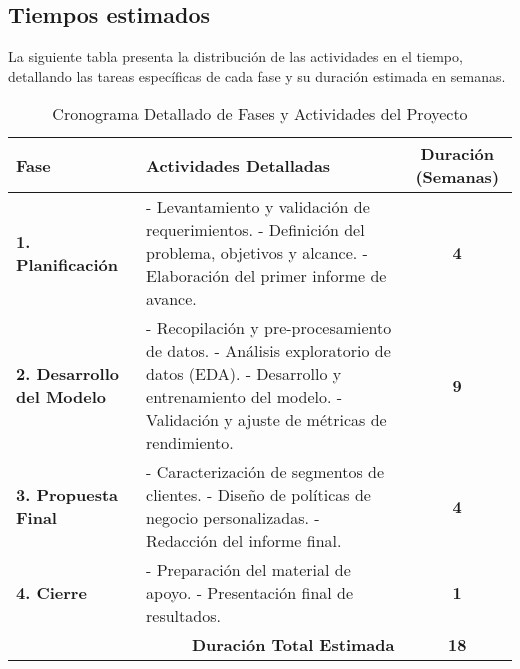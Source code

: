 \subsection{Tiempos estimados}
La siguiente tabla presenta la distribución de las actividades en el tiempo, detallando las tareas específicas de cada fase y su duración estimada en semanas.

\begin{table}[H]
  \begin{threeparttable}
    \centering
    \scriptsize
    \caption{Cronograma Detallado de Fases y Actividades del Proyecto}
    \renewcommand{\arraystretch}{1.5}
    \begin{tabular}{|l|p{9cm}|c|}
      \hline
      \textbf{Fase} & \textbf{Actividades Detalladas} & \textbf{Duración (Semanas)} \\
      \hline
      \textbf{1. Planificación} & 
      - Levantamiento y validación de requerimientos. \newline
      - Definición del problema, objetivos y alcance. \newline
      - Elaboración del primer informe de avance. & 
      \textbf{4} \\
      \hline
      \textbf{2. Desarrollo del Modelo} & 
      - Recopilación y pre-procesamiento de datos. \newline
      - Análisis exploratorio de datos (EDA). \newline
      - Desarrollo y entrenamiento del modelo. \newline
      - Validación y ajuste de métricas de rendimiento. & 
      \textbf{9} \\
      \hline
      \textbf{3. Propuesta Final} & 
      - Caracterización de segmentos de clientes. \newline
      - Diseño de políticas de negocio personalizadas. \newline
      - Redacción del informe final. & 
      \textbf{4} \\
      \hline
      \textbf{4. Cierre} & 
      - Preparación del material de apoyo. \newline
      - Presentación final de resultados. & 
      \textbf{1} \\
      \hline
      \multicolumn{2}{|r|}{\textbf{Duración Total Estimada}} & \textbf{18} \\
      \hline
    \end{tabular}
    \label{tab:cronograma}
  \end{threeparttable}
\end{table}

